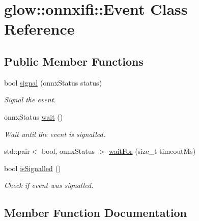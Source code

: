 \hypertarget{classglow_1_1onnxifi_1_1_event}{}\section{glow\+:\+:onnxifi\+:\+:Event Class Reference}
\label{classglow_1_1onnxifi_1_1_event}
\subsection*{Public Member Functions}
\begin{DoxyCompactItemize}
\item 
\mbox{\label{classglow_1_1onnxifi_1_1_event_aeeac3c3943a4a3d81fe939e1ad7481ef}} 
bool \hyperlink{classglow_1_1onnxifi_1_1_event_aeeac3c3943a4a3d81fe939e1ad7481ef}{signal} (onnx\+Status status)
\begin{DoxyCompactList}\small\item\em Signal the event. \end{DoxyCompactList}\item 
\mbox{\label{classglow_1_1onnxifi_1_1_event_a4384d6c1e3b48b2f441ddd656b60ef7d}} 
onnx\+Status \hyperlink{classglow_1_1onnxifi_1_1_event_a4384d6c1e3b48b2f441ddd656b60ef7d}{wait} ()
\begin{DoxyCompactList}\small\item\em Wait until the event is signalled. \end{DoxyCompactList}\item 
std\+::pair$<$ bool, onnx\+Status $>$ \hyperlink{classglow_1_1onnxifi_1_1_event_abe39536375beee587f43b1f0d98c3543}{wait\+For} (size\+\_\+t timeout\+Ms)
\item 
\mbox{\label{classglow_1_1onnxifi_1_1_event_a13c3bdce54cd8f889e0daedee087dfab}} 
bool \hyperlink{classglow_1_1onnxifi_1_1_event_a13c3bdce54cd8f889e0daedee087dfab}{is\+Signalled} ()
\begin{DoxyCompactList}\small\item\em Check if event was signalled. \end{DoxyCompactList}\end{DoxyCompactItemize}


\subsection{Member Function Documentation}
\mbox{\label{classglow_1_1onnxifi_1_1_event_abe39536375beee587f43b1f0d98c3543}} 
